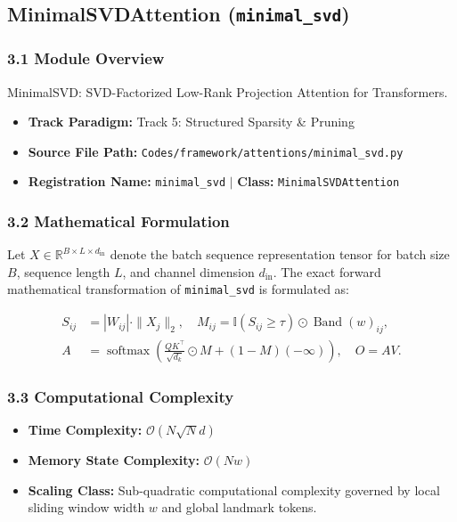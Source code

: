 \subsection{MinimalSVDAttention (\texttt{minimal\_svd})}
\label{sec:app_module_minimal_svd}

\subsubsection*{3.1 Module Overview}
MinimalSVD: SVD-Factorized Low-Rank Projection Attention for Transformers.
\begin{itemize}
    \item \textbf{Track Paradigm:} Track 5: Structured Sparsity \& Pruning
    \item \textbf{Source File Path:} \texttt{Codes/framework/attentions/minimal\_svd.py}
    \item \textbf{Registration Name:} \texttt{minimal\_svd} $\mid$ \textbf{Class:} \texttt{MinimalSVDAttention}
\end{itemize}

\subsubsection*{3.2 Mathematical Formulation}
Let $X \in \mathbb{R}^{B \times L \times d_{\text{in}}}$ denote the batch sequence representation tensor for batch size $B$, sequence length $L$, and channel dimension $d_{\text{in}}$. The exact forward mathematical transformation of \texttt{minimal\_svd} is formulated as:

\begin{align}
S_{ij} &= |W_{ij}| \cdot \|X_j\|_2, \quad M_{ij} = \mathbb{I}(S_{ij} \ge \tau) \odot \operatorname{Band}(w)_{ij}, \\
A &= \operatorname{softmax}\left(\frac{Q K^\top}{\sqrt{d_k}} \odot M + (1 - M)(-\infty)\right), \quad O = A V.
\end{align}


\subsubsection*{3.3 Computational Complexity}
\begin{itemize}
    \item \textbf{Time Complexity:} $\mathcal{O}(N \sqrt{N} d)$
    \item \textbf{Memory State Complexity:} $\mathcal{O}(N w)$
    \item \textbf{Scaling Class:} Sub-quadratic computational complexity governed by local sliding window width $w$ and global landmark tokens.
\end{itemize}

